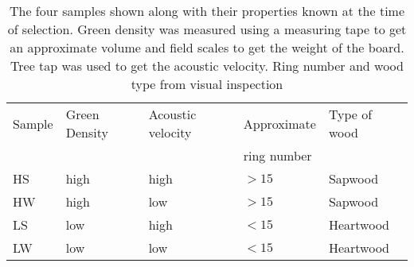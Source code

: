 \documentclass[10pt]{article}
\begin{document}
\begin{table}\label{table:mill samples table}
\caption[Initial properties of samples]{The four samples shown along with their properties known at the time of selection. Green density was measured using a measuring tape to get an approximate volume and field scales to get the weight of the board. Tree tap was used to get the acoustic velocity. Ring number and wood type from visual inspection}
\begin{tabular}{l l l l l}
\hline
Sample & Green Density & Acoustic velocity & Approximate & Type of wood\\
       &               &                   & ring number &              \\
\hline
HS& high & high & \(>15\) & Sapwood\\
HW& high & low & \(>15\) & Sapwood\\
LS& low & high & \(<15\) & Heartwood\\
LW& low & low & \(<15\) & Heartwood\\
\hline
\end{tabular}
\end{table}
\end{document}
